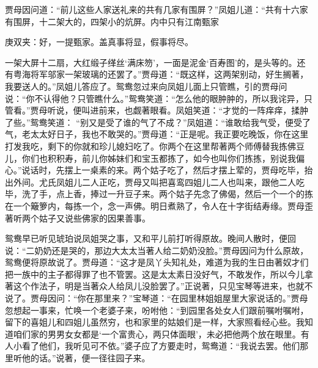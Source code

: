 \begin{parag}
    贾母因问道：“前儿这些人家送礼来的共有几家有围屏？”凤姐儿道：“共有十六家有围屏，十二架大的，四架小的炕屏。内中只有江南甄家\begin{note}庚双夹：好，一提甄家。盖真事将显，假事将尽。\end{note}一架大屏十二扇，大红缎子缂丝‘满床笏’，一面是泥金‘百寿图’的，是头等的。还有粤海将军邬家一架玻璃的还罢了。”贾母道：“既这样，这两架别动，好生搁著，我要送人的。”凤姐儿答应了。鸳鸯忽过来向凤姐儿面上只管瞧，引的贾母问说：“你不认得他？只管瞧什么。”鸳鸯笑道：“怎么他的眼肿肿的，所以我诧异，只管看。”贾母听说，便叫进前来，也觑著眼看。凤姐笑道：“才觉的一阵痒痒，揉肿了些。”鸳鸯笑道： “别又是受了谁的气了不成？”凤姐道：“谁敢给我气受，便受了气，老太太好日子，我也不敢哭的。”贾母道：“正是呢。我正要吃晚饭，你在这里打发我吃，剩下的你就和珍儿媳妇吃了。你两个在这里帮著两个师傅替我拣佛豆儿，你们也积积寿，前儿你姊妹们和宝玉都拣了，如今也叫你们拣拣，别说我偏心。”说话时，先摆上一桌素的来。两个姑子吃了，然后才摆上荤的，贾母吃毕，抬出外间。尤氏凤姐儿二人正吃，贾母又叫把喜鸾四姐儿二人也叫来，跟他二人吃毕，洗了手，点上香，捧过一升豆子来。两个姑子先念了佛偈，然后一个一个的拣在一个簸箩内，每拣一个，念一声佛。明日煮熟了，令人在十字街结寿缘。贾母歪著听两个姑子又说些佛家的因果善事。
\end{parag}


\begin{parag}
    鸳鸯早已听见琥珀说凤姐哭之事，又和平儿前打听得原故。晚间人散时，便回说：“二奶奶还是哭的，那边大太太当著人给二奶奶没脸。”贾母因问为什么原故，鸳鸯便将原故说了。贾母道：“这才是凤丫头知礼处，难道为我的生日由著奴才们把一族中的主子都得罪了也不管罢。这是太太素日没好气，不敢发作，所以今儿拿著这个作法子，明是当著众人给凤儿没脸罢了。”正说著，只见宝琴等进来，也就不说了。贾母因问：“你在那里来？”宝琴道：“在园里林姐姐屋里大家说话的。”贾母忽想起一事来，忙唤一个老婆子来，吩咐他：“到园里各处女人们跟前嘱咐嘱咐，留下的喜姐儿和四姐儿虽然穷，也和家里的姑娘们是一样，大家照看经心些。我知道咱们家的男男女女都是‘一个富贵心，两只体面眼’，未必把他两个放在眼里。有人小看了他们，我听见可不依。”婆子应了方要走时，鸳鸯道：“我说去罢。他们那里听他的话。”说著，便一径往园子来。
\end{parag}


